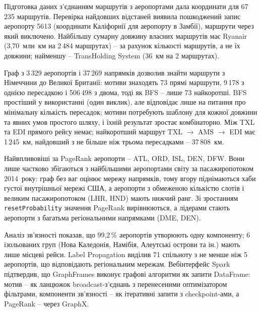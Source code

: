 \documentclass{iasa-lab}
\begin{document}
Підготовка даних з'єднанням маршрутів з аеропортами дала координати для 67\,235 маршрутів. Перевірка найдовших відстаней виявила пошкоджений запис аеропорту 5613 (координати Каліфорнії для аеропорту в Замбії), маршрути через який виключено. Найбільшу сумарну довжину власних маршрутів має Ryanair (3,70~млн~км на 2\,484 маршрутах) -- за рахунок кількості маршрутів, а не їх довжини; найменшу -- TransHolding System (36~км на 2 маршрутах).

Граф з 3\,329 аеропортів і 37\,269 напрямків дозволив знайти маршрути з Німеччини до Великої Британії: мотиви знаходять 73 прямі маршрути, 9\,178 з однією пересадкою і 506\,498 з двома, тоді як BFS -- лише 73 найкоротші. BFS простіший у використанні (один виклик), але відповідає лише на питання про мінімальну кількість пересадок; мотиви потребують шаблону для кожної довжини та явних умов простого шляху, і їхній результат зростає комбінаторно. Між TXL та EDI прямого рейсу немає; найкоротший маршрут TXL $\to$ AMS $\to$ EDI має 1\,245~км, найдовший з не більше ніж трьома пересадками -- 37\,808~км.

Найвпливовіші за PageRank аеропорти -- ATL, ORD, ISL, DEN, DFW. Вони лише частково збігаються з найбільшими аеропортами світу за пасажиропотоком 2014~року: граф без ваг оцінює мережу напрямків, тому вгору піднімаються хаби густої внутрішньої мережі США, а аеропорти з обмеженою кількістю слотів і великим пасажиропотоком (LHR, HND) мають нижчий ранг. Зі зростанням \texttt{resetProbability} значення PageRank вирівнюються, а лідерами стають аеропорти з багатьма регіональними напрямками (DME, DEN).

Аналіз зв'язності показав, що 99,2\,\% аеропортів утворюють одну компоненту; 6 ізольованих груп (Нова Каледонія, Намібія, Алеутські острови та ін.) мають лише місцеві рейси. Label Propagation виділив 71 спільноту з не менше ніж 5 аеропортів, що відповідають регіональним мережам. Вебінтерфейс Spark підтвердив, що GraphFrames виконує графові алгоритми як запити DataFrame: мотив -- як ланцюжок broadcast-з'єднань з перенесеними оптимізатором фільтрами, компоненти зв'язності -- як ітеративні запити з checkpoint-ами, а PageRank -- через GraphX.

\printbibliography[heading=bibintoc, title={Список використаних джерел}]

\clearpage
{}
\end{document}
